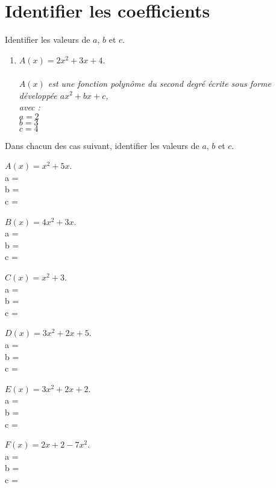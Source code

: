 \documentclass[11pt]{article}
\begin{document}
\section{Identifier les coefficients}

\begin{exercice}
Identifier les valeurs de $a$, $b$ et
$c$.
\begin{enumerate}[itemsep=1em,label={}]
\item $A(x) = 2x^2+3x+4$. \\ \\
\textit{$A(x)$ est une fonction polynôme du second degré écrite sous forme
développée $ax^2+bx+c$, \\avec : \\}
$a = 2$ \\ 
$b = 3$ \\ 
$c = 4$   
\end{enumerate}
\end{exercice}


\begin{exercice}
Dans chacun des cas suivant, identifier les valeurs de $a$, $b$ et
$c$.
\begin{enumerate}[itemsep=1em,label={}]
  \begin{multicols}{2}
  \item $A(x) = x^2+5x$. \\ a = \dotfill \\ b = \dotfill \\ c =
    \dotfill
  \item $B(x) = 4x^2+3x$. \\ a = \dotfill \\ b = \dotfill \\ c =
    \dotfill
  \item $C(x) = x^2+3$. \\ a = \dotfill \\ b = \dotfill \\ c =
    \dotfill
  \item $D(x) = 3x^2+2x+5$. \\ a = \dotfill \\ b = \dotfill \\ c =
    \dotfill
  \item $E(x) = 3x^2+2x+2$. \\ a = \dotfill \\ b = \dotfill \\ c =
    \dotfill
  \item $F(x) = 2x+2-7x^2$. \\ a = \dotfill \\ b = \dotfill \\ c =
    \dotfill
  \end{multicols}
\end{enumerate}
\end{exercice}
\end{document}
